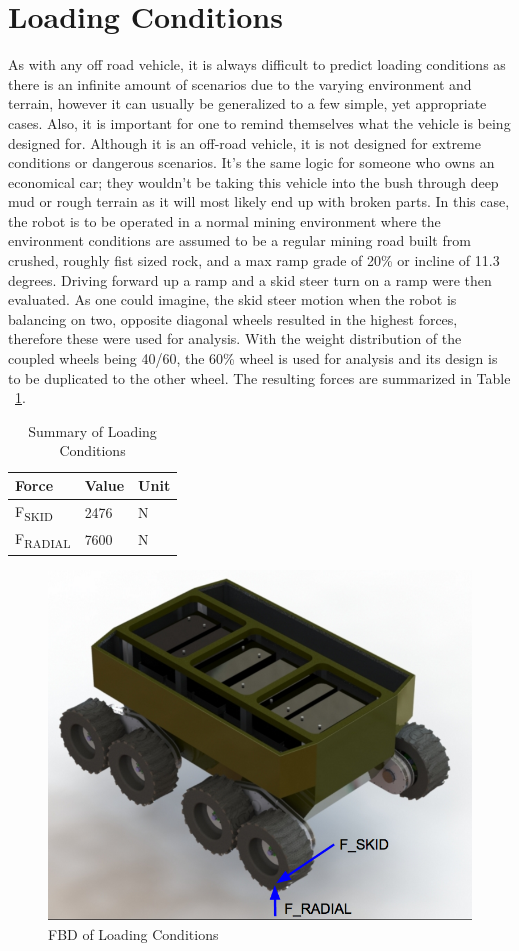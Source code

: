 \section{Loading Conditions}
As with any off road vehicle, it is always difficult to predict loading conditions as there is an infinite amount of scenarios due to the varying environment and terrain, however it can usually be generalized to a few simple, yet appropriate cases. Also, it is important for one to remind themselves what the vehicle is being designed for. Although it is an off-road vehicle, it is not designed for extreme conditions or dangerous scenarios. It's the same logic for someone who owns an economical car; they wouldn't be taking this vehicle into the bush through deep mud or rough terrain as it will most likely end up with broken parts. In this case, the robot is to be operated in a normal mining environment where the environment conditions are assumed to be a regular mining road built from crushed, roughly fist sized rock, and a max ramp grade of 20\% or incline of 11.3 degrees. Driving forward up a ramp and a skid steer turn on a ramp were then evaluated. As one could imagine, the skid steer motion when the robot is balancing on two, opposite diagonal wheels resulted in the highest forces, therefore these were used for analysis. With the weight distribution of the coupled wheels being 40/60, the 60\% wheel is used for analysis and its design is to be duplicated to the other wheel. The resulting forces are summarized in Table ~\ref{tab:sumforces}.

\begin{table}[htbp]
	\centering
	\caption{Summary of Loading Conditions}
	\begin{tabular}{| p{5cm}ll |} \hline
		Force & Value & Unit \\ \hline
		F\textsubscript{SKID} & 2476 & N \\ \hline
		F\textsubscript{RADIAL} & 7600 & N \\ \hline
	\end{tabular}
	\label{tab:sumforces}
\end{table}

\begin{figure}[h]\centering
	\includegraphics[width=.7\linewidth]{images/loading_conditions.png}
	\caption{FBD of Loading Conditions}
	\label{fig:load_cond}
\end{figure}
   
